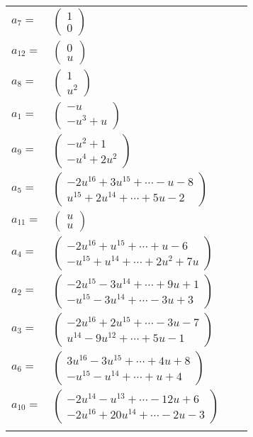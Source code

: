 \documentclass[1p]{elsarticle_modified}
\theoremstyle{definition}
\begin{document}
\begin{tabular}{m{7pt} m{180pt} m{7pt} m{180pt} }
\flushright $a_{7}=$&$\begin{pmatrix}1\\0\end{pmatrix}$ \\
\flushright $a_{12}=$&$\begin{pmatrix}0\\u\end{pmatrix}$ \\
\flushright $a_{8}=$&$\begin{pmatrix}1\\u^2\end{pmatrix}$ \\
\flushright $a_{1}=$&$\begin{pmatrix}- u\\- u^3+u\end{pmatrix}$ \\
\flushright $a_{9}=$&$\begin{pmatrix}- u^2+1\\- u^4+2 u^2\end{pmatrix}$ \\
\flushright $a_{5}=$&$\begin{pmatrix}-2 u^{16}+3 u^{15}+\cdots- u-8\\u^{15}+2 u^{14}+\cdots+5 u-2\end{pmatrix}$ \\
\flushright $a_{11}=$&$\begin{pmatrix}u\\u\end{pmatrix}$ \\
\flushright $a_{4}=$&$\begin{pmatrix}-2 u^{16}+u^{15}+\cdots+u-6\\- u^{15}+u^{14}+\cdots+2 u^2+7 u\end{pmatrix}$ \\
\flushright $a_{2}=$&$\begin{pmatrix}-2 u^{15}-3 u^{14}+\cdots+9 u+1\\- u^{15}-3 u^{14}+\cdots-3 u+3\end{pmatrix}$ \\
\flushright $a_{3}=$&$\begin{pmatrix}-2 u^{16}+2 u^{15}+\cdots-3 u-7\\u^{14}-9 u^{12}+\cdots+5 u-1\end{pmatrix}$ \\
\flushright $a_{6}=$&$\begin{pmatrix}3 u^{16}-3 u^{15}+\cdots+4 u+8\\- u^{15}- u^{14}+\cdots+u+4\end{pmatrix}$ \\
\flushright $a_{10}=$&$\begin{pmatrix}-2 u^{14}- u^{13}+\cdots-12 u+6\\-2 u^{16}+20 u^{14}+\cdots-2 u-3\end{pmatrix}$\\&\end{tabular}
\end{document}
